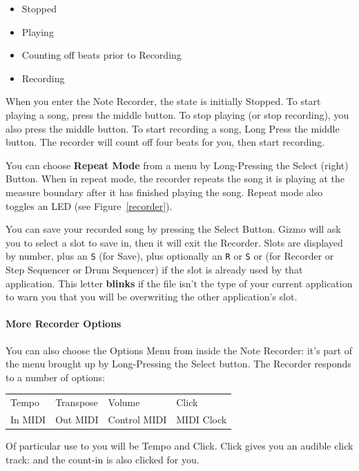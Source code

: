 \documentclass{article}
\begin{document}
\begin{itemize}
\item Stopped
\item Playing
\item Counting off beats prior to Recording
\item Recording
\end{itemize}

When you enter the Note Recorder, the state is initially Stopped.  To start playing a song, press the middle button.  To stop playing (or stop recording), you also press the middle button.  To start recording a song, Long Press the middle button.  The recorder will count off four beats for you, then start recording.

You can choose {\bf Repeat Mode} from a menu by Long-Pressing the Select (right) Button.  When in repeat mode, the recorder repeats the song it is playing at the measure boundary after it has finished playing the song.  Repeat mode also toggles an LED (see Figure~\ref{recorder}).

You can save your recorded song by pressing the Select Button.  Gizmo will ask you to select a slot to save in, then it will exit the Recorder.  Slots are displayed by number, plus an \texttt{S} (for Save), plus optionally an \texttt{R} or \texttt{S} or  (for Recorder or Step Sequencer or Drum Sequencer) if the slot is already used by that application.  This letter {\bf blinks} if the file isn't the type of your current application to warn you that you will be overwriting the other application's slot.

\paragraph{More Recorder Options}  
You can also choose the Options Menu from inside the Note Recorder: it's part of the menu brought up by Long-Pressing the Select button.  The Recorder responds to a number of options:

\vspace{1em}
\begin{tabular}{llll}
Tempo&Transpose&Volume&Click\\
In MIDI& Out MIDI&Control MIDI&MIDI Clock\\
\end{tabular}

\vspace{1em}
Of particular use to you will be Tempo and Click.  Click gives you an audible click track: and the count-in is also clicked for you.
\end{document}
